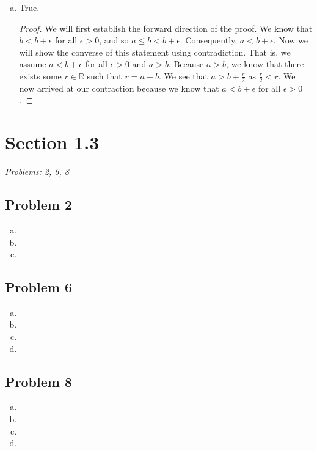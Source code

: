 \documentclass[12pt]{article}
\begin{document}
\begin{enumerate}[c).]
    \item {
    True. 
    \begin{proof}
        We will first establish the forward direction of the proof. 
        We know that $b < b + \epsilon$ for all $\epsilon > 0$, and so $a \le b < b + \epsilon$. 
        Consequently, $a < b + \epsilon$. 
        Now we will show the converse of this statement using contradiction. 
        That is, we assume $a < b + \epsilon$ for all $\epsilon > 0$ and $a>b$. 
        Because $a > b$, we know that there exists some $r \in \mathbb{R}$ such that $r = a - b$. 
        We see that $a > b + \frac{r}{2}$ as $\frac{r}{2} < r$.
        We now arrived at our contraction because we know that $a < b + \epsilon$ for all $\epsilon > 0$.
    \end{proof}
    }
\end{enumerate}


\vspace*{1cm}


\section*{Section 1.3}
\textit{Problems: 2, 6, 8}

\subsection*{Problem 2}
\begin{enumerate}[a).]
    \item {

    }
    \item {

    }
    \item {

    }
\end{enumerate}

\subsection*{Problem 6}

\begin{enumerate}[a).]
    \item {
    
    }
    \item {

    }
    \item {

    }
    \item{

    }
\end{enumerate}

\subsection*{Problem 8}
\begin{enumerate}[a).]
    \item {

    }
    \item {

    }
    \item {

    }
    \item{

    }
\end{enumerate}
\end{document}
